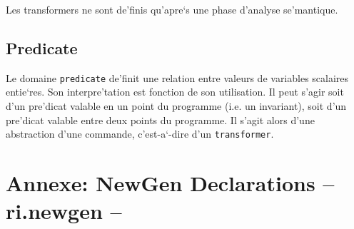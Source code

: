 Les transformers ne sont de'finis qu'apre`s une phase d'analyse se'mantique.

\subsection{Predicate}
\label{subsection-predicate}

{}

Le domaine {\tt predicate} de'finit une relation entre valeurs de
variables scalaires entie`res. Son interpre'tation est fonction de
son utilisation. Il peut s'agir soit d'un pre'dicat valable en
un point du programme (i.e. un invariant), soit d'un pre'dicat
valable entre deux points du programme. Il s'agit alors d'une
abstraction d'une commande, c'est-a`-dire d'un {\tt transformer}.

\newpage

\section*{Annexe: NewGen Declarations -- ri.newgen --}

